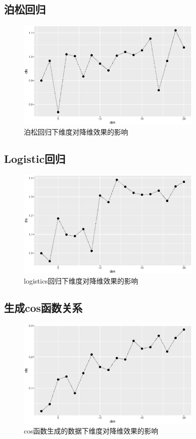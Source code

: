 \subsection{泊松回归}
\begin{figure}[H]
    \centering
    \includegraphics[width=0.8\textwidth]{image/pois_phd.eps}
    \caption{泊松回归下维度对降维效果的影响}
\end{figure}

\subsection{Logistic回归}

\begin{figure}[H]
    \centering
    \includegraphics[width=0.8\textwidth]{image/logit_phd.eps}
    \caption{logistics回归下维度对降维效果的影响}
\end{figure}

\subsection{生成cos函数关系}
\begin{figure}[H]
    \centering
    \includegraphics[width=0.8\textwidth]{image/cos_phd.eps}
    \caption{cos函数生成的数据下维度对降维效果的影响}
\end{figure}

